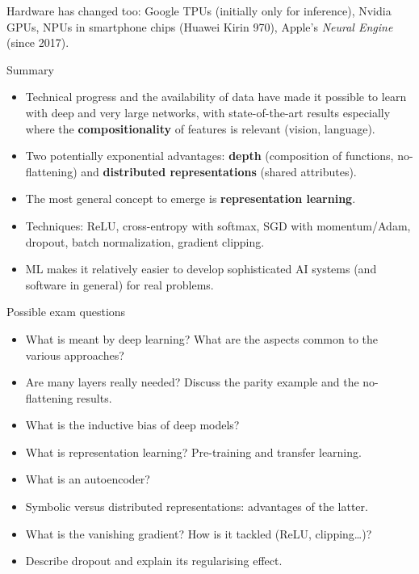 Hardware has changed too: Google TPUs (initially only for inference),
Nvidia GPUs, NPUs in smartphone chips (Huawei Kirin 970), Apple's
\emph{Neural Engine} (since 2017).

\begin{boxabstract}{Summary}

\begin{itemize}
\tightlist
\item
  Technical progress and the availability of data have made it possible
  to learn with deep and very large networks, with state-of-the-art
  results especially where the \textbf{compositionality} of features is
  relevant (vision, language).
\item
  Two potentially exponential advantages: \textbf{depth} (composition
  of functions, no-flattening) and \textbf{distributed representations}
  (shared attributes).
\item
  The most general concept to emerge is \textbf{representation
  learning}.
\item
  Techniques: ReLU, cross-entropy with softmax, SGD with momentum/Adam,
  dropout, batch normalization, gradient clipping.
\item
  ML makes it relatively easier to develop sophisticated AI systems
  (and software in general) for real problems.
\end{itemize}

\end{boxabstract}

\begin{boxquestion}{Possible exam questions}

\begin{itemize}
\tightlist
\item
  What is meant by deep learning? What are the aspects common to the
  various approaches?
\item
  Are many layers really needed? Discuss the parity example and the
  no-flattening results.
\item
  What is the inductive bias of deep models?
\item
  What is representation learning? Pre-training and transfer learning.
\item
  What is an autoencoder?
\item
  Symbolic versus distributed representations: advantages of the
  latter.
\item
  What is the vanishing gradient? How is it tackled (ReLU,
  clipping\ldots)?
\item
  Describe dropout and explain its regularising effect.
\end{itemize}

\end{boxquestion}
